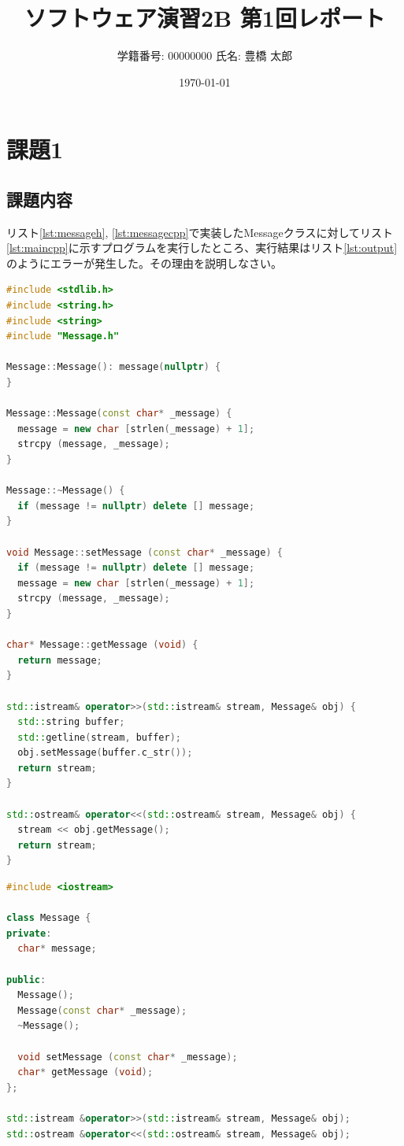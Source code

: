 \documentclass[paper=a4,fontsize=11pt]{jlreq}
\title{ソフトウェア演習2B 第1回レポート}
\author{学籍番号: 00000000 \quad 氏名: 豊橋 太郎}
\date{\today}
\begin{document}
\maketitle

\section{課題1}
\subsection{課題内容}

リスト\ref{lst:messageh}, \ref{lst:messagecpp}で実装したMessageクラスに対してリスト\ref{lst:maincpp}に示すプログラムを実行したところ、実行結果はリスト\ref{lst:output}のようにエラーが発生した。その理由を説明しなさい。

\begin{lstlisting}[language=C++, caption=Message.cpp, label=lst:messageh]
#include <stdlib.h>
#include <string.h>
#include <string>
#include "Message.h"

Message::Message(): message(nullptr) {
}

Message::Message(const char* _message) {
  message = new char [strlen(_message) + 1];
  strcpy (message, _message);
}

Message::~Message() {
  if (message != nullptr) delete [] message;
}

void Message::setMessage (const char* _message) {
  if (message != nullptr) delete [] message;
  message = new char [strlen(_message) + 1];
  strcpy (message, _message);
}

char* Message::getMessage (void) {
  return message;
}

std::istream& operator>>(std::istream& stream, Message& obj) {
  std::string buffer;
  std::getline(stream, buffer);
  obj.setMessage(buffer.c_str());
  return stream;
}

std::ostream& operator<<(std::ostream& stream, Message& obj) {
  stream << obj.getMessage();
  return stream;
}
\end{lstlisting}

\begin{lstlisting}[language=C++, caption=Message.h, label=lst:messagecpp]
#include <iostream>

class Message {
private:
  char* message;

public:
  Message();
  Message(const char* _message);
  ~Message();

  void setMessage (const char* _message);
  char* getMessage (void);
};

std::istream &operator>>(std::istream& stream, Message& obj);
std::ostream &operator<<(std::ostream& stream, Message& obj);
\end{lstlisting}
\end{document}
